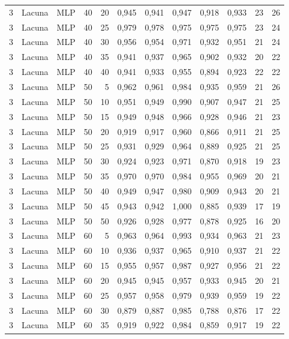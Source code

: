 \begin{longtable}{@{}rllrrrrrrrrr@{}}
3 & Lacuna & MLP & 40 & 20 & 0,945 & 0,941 & 0,947 & 0,918 & 0,933 & 23 & 26 \\
3 & Lacuna & MLP & 40 & 25 & 0,979 & 0,978 & 0,975 & 0,975 & 0,975 & 23 & 24 \\
3 & Lacuna & MLP & 40 & 30 & 0,956 & 0,954 & 0,971 & 0,932 & 0,951 & 21 & 24 \\
3 & Lacuna & MLP & 40 & 35 & 0,941 & 0,937 & 0,965 & 0,902 & 0,932 & 20 & 22 \\
3 & Lacuna & MLP & 40 & 40 & 0,941 & 0,933 & 0,955 & 0,894 & 0,923 & 22 & 22 \\
3 & Lacuna & MLP & 50 & 5 & 0,962 & 0,961 & 0,984 & 0,935 & 0,959 & 21 & 26 \\
3 & Lacuna & MLP & 50 & 10 & 0,951 & 0,949 & 0,990 & 0,907 & 0,947 & 21 & 25 \\
3 & Lacuna & MLP & 50 & 15 & 0,949 & 0,948 & 0,966 & 0,928 & 0,946 & 21 & 23 \\
3 & Lacuna & MLP & 50 & 20 & 0,919 & 0,917 & 0,960 & 0,866 & 0,911 & 21 & 25 \\
3 & Lacuna & MLP & 50 & 25 & 0,931 & 0,929 & 0,964 & 0,889 & 0,925 & 21 & 25 \\
3 & Lacuna & MLP & 50 & 30 & 0,924 & 0,923 & 0,971 & 0,870 & 0,918 & 19 & 23 \\
3 & Lacuna & MLP & 50 & 35 & 0,970 & 0,970 & 0,984 & 0,955 & 0,969 & 20 & 21 \\
3 & Lacuna & MLP & 50 & 40 & 0,949 & 0,947 & 0,980 & 0,909 & 0,943 & 20 & 21 \\
3 & Lacuna & MLP & 50 & 45 & 0,943 & 0,942 & 1,000 & 0,885 & 0,939 & 17 & 19 \\
3 & Lacuna & MLP & 50 & 50 & 0,926 & 0,928 & 0,977 & 0,878 & 0,925 & 16 & 20 \\
3 & Lacuna & MLP & 60 & 5 & 0,963 & 0,964 & 0,993 & 0,934 & 0,963 & 21 & 23 \\
3 & Lacuna & MLP & 60 & 10 & 0,936 & 0,937 & 0,965 & 0,910 & 0,937 & 21 & 22 \\
3 & Lacuna & MLP & 60 & 15 & 0,955 & 0,957 & 0,987 & 0,927 & 0,956 & 21 & 22 \\
3 & Lacuna & MLP & 60 & 20 & 0,945 & 0,945 & 0,957 & 0,933 & 0,945 & 20 & 21 \\
3 & Lacuna & MLP & 60 & 25 & 0,957 & 0,958 & 0,979 & 0,939 & 0,959 & 19 & 22 \\
3 & Lacuna & MLP & 60 & 30 & 0,879 & 0,887 & 0,985 & 0,788 & 0,876 & 17 & 22 \\
3 & Lacuna & MLP & 60 & 35 & 0,919 & 0,922 & 0,984 & 0,859 & 0,917 & 19 & 22 \\

\end{longtable}
